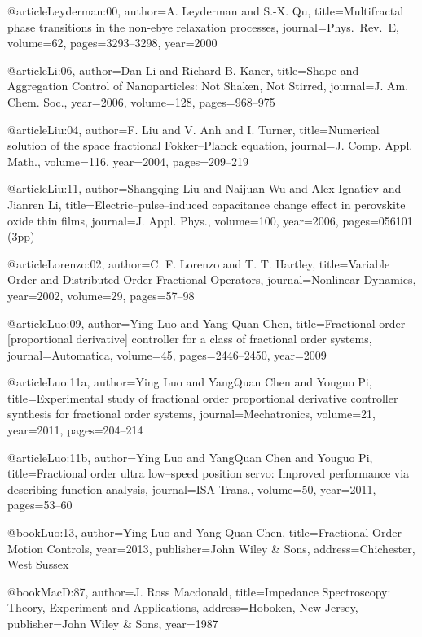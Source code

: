 \begin{thebibliography}{99}
@article{Leyderman:00,
  author={A. Leyderman and S.-X. Qu},
  title={Multifractal phase transitions in the non-ebye relaxation
    processes},
  journal={Phys.\ Rev.\ E},
  volume={62},
  pages={3293--3298},
  year={2000}
}

@article{Li:06,
  author={Dan Li and Richard B. Kaner},
  title={Shape and Aggregation Control of Nanoparticles: Not Shaken, Not Stirred},
  journal={J. Am. Chem. Soc.},
  year={2006},
  volume={128},
  pages={968--975}
}

@article{Liu:04,
  author={F. Liu and V. Anh and I. Turner},
  title={Numerical solution of the space fractional Fokker--Planck equation},
  journal={J. Comp. Appl. Math.},
  volume={116},
  year={2004},
  pages={209--219}
}

@article{Liu:11,
  author={Shangqing Liu and Naijuan Wu and Alex Ignatiev and Jianren Li},
  title={Electric--pulse--induced capacitance change effect in perovskite oxide
    thin films},
  journal={J. Appl. Phys.},
  volume={100},
  year={2006},
  pages={056101 (3pp)}
}

@article{Lorenzo:02,
  author={C. F. Lorenzo and T. T. Hartley},
  title={Variable Order and Distributed Order Fractional Operators},
  journal={Nonlinear Dynamics},
  year={2002},
  volume={29},
  pages={57--98}
}

@article{Luo:09,
  author={Ying Luo and Yang-Quan Chen},
  title={Fractional order [proportional derivative] controller for a class of fractional
    order systems},
  journal={Automatica},
  volume={45},
  pages={2446--2450},
  year={2009}
}

@article{Luo:11a,
  author={Ying Luo and Yang{Q}uan Chen and Youguo Pi},
  title={Experimental study of fractional order proportional derivative controller
    synthesis for fractional order systems},
  journal={Mechatronics},
  volume={21},
  year={2011},
  pages={204--214}
}

@article{Luo:11b,
  author={Ying Luo and Yang{Q}uan Chen and Youguo Pi},
  title={Fractional order ultra low--speed position servo: Improved performance
    via describing function analysis},
  journal={ISA Trans.},
  volume={50},
  year={2011},
  pages={53--60}
}

@book{Luo:13,
  author={Ying Luo and Yang-Quan Chen},
  title={Fractional Order Motion Controls},
  year={2013},
  publisher={John Wiley {\&} Sons},
  address={Chichester, West Sussex}
}

@book{MacD:87,
  author={J. Ross Macdonald},
  title={Impedance Spectroscopy: Theory, Experiment and Applications},
  address={Hoboken, New Jersey},
  publisher={John Wiley {\&} Sons},
  year={1987}
}


\end{thebibliography}
